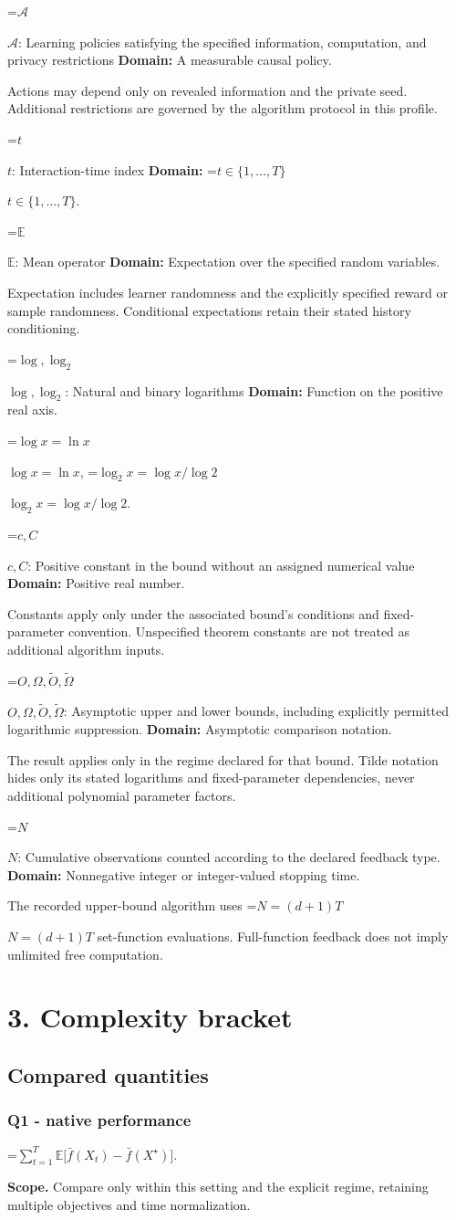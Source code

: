 \documentclass[10pt,a4paper]{article}
\newcommand{\AtlasMath}[1]{\par\begingroup\centering\setbox0=\hbox{$\displaystyle #1$}\ifdim\wd0>1.4\linewidth\typeout{ATLAS WIDE FORMULA: \the\wd0}\fi\ifdim\wd0>\linewidth\resizebox{\linewidth}{!}{\box0}\else\box0\fi\par\endgroup}
\newcommand{\AtlasInlineMath}[1]{\begingroup\setbox0=\hbox{$#1$}\ifdim\wd0>.4\linewidth\endgroup\AtlasMath{#1}\else\endgroup$#1$\fi}
\begin{document}
\AtlasInlineMath{\mathcal A}: Learning policies satisfying the specified information, computation, and privacy restrictions \textbf{Domain:} A measurable causal policy.

Actions may depend only on revealed information and the private seed. Additional restrictions are governed by the algorithm protocol in this profile.

\AtlasInlineMath{t}: Interaction-time index \textbf{Domain:} \AtlasInlineMath{t\in\{1,\ldots,T\}}.

\AtlasInlineMath{\mathbb E}: Mean operator \textbf{Domain:} Expectation over the specified random variables.

Expectation includes learner randomness and the explicitly specified reward or sample randomness. Conditional expectations retain their stated history conditioning.

\AtlasInlineMath{\log,\log_2}: Natural and binary logarithms \textbf{Domain:} Function on the positive real axis.

\AtlasInlineMath{\log x=\ln x}, \AtlasInlineMath{\log_2x=\log x/\log2}.

\AtlasInlineMath{c,C}: Positive constant in the bound without an assigned numerical value \textbf{Domain:} Positive real number.

Constants apply only under the associated bound’s conditions and fixed-parameter convention. Unspecified theorem constants are not treated as additional algorithm inputs.

\AtlasInlineMath{O,\Omega,\widetilde O,\widetilde\Omega}: Asymptotic upper and lower bounds, including explicitly permitted logarithmic suppression. \textbf{Domain:} Asymptotic comparison notation.

The result applies only in the regime declared for that bound. Tilde notation hides only its stated logarithms and fixed-parameter dependencies, never additional polynomial parameter factors.

\AtlasInlineMath{N}: Cumulative observations counted according to the declared feedback type. \textbf{Domain:} Nonnegative integer or integer-valued stopping time.

The recorded upper-bound algorithm uses \AtlasInlineMath{N=(d+1)T} set-function evaluations. Full-function feedback does not imply unlimited free computation.

\section{3. Complexity bracket}
\subsection{Compared quantities}
\subsubsection{Q1 - native performance}
\AtlasMath{\sum_{t=1}^{T}\mathbb E\bigl[\bar f(X_t)-\bar f(X^\star)\bigr].}
\textbf{Scope.} Compare only within this setting and the explicit regime, retaining multiple objectives and time normalization.
\end{document}
